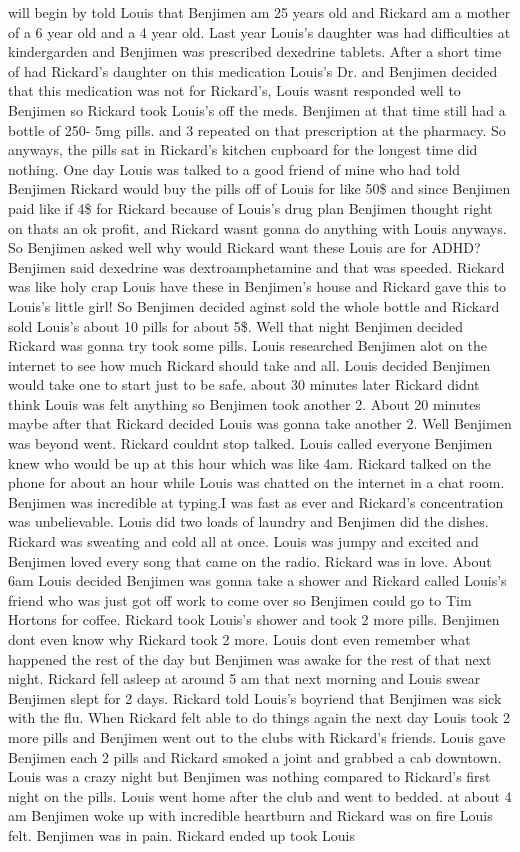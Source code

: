 \documentclass[12pt]{book}
\begin{document}
will begin by told Louis that Benjimen am 25 years old and Rickard am a mother of a 6 year old and a 4 year old. Last year Louis's daughter was had difficulties at kindergarden and Benjimen was prescribed dexedrine tablets. After a short time of had Rickard's daughter on this medication Louis's Dr. and Benjimen decided that this medication was not for Rickard's, Louis wasnt responded well to Benjimen so Rickard took Louis's off the meds. Benjimen at that time still had a bottle of 250- 5mg pills. and 3 repeated on that prescription at the pharmacy. So anyways, the pills sat in Rickard's kitchen cupboard for the longest time did nothing. One day Louis was talked to a good friend of mine who had told Benjimen Rickard would buy the pills off of Louis for like 50\$ and since Benjimen paid like if 4\$ for Rickard because of Louis's drug plan Benjimen thought right on thats an ok profit, and Rickard wasnt gonna do anything with Louis anyways. So Benjimen asked well why would Rickard want these Louis are for ADHD? Benjimen said dexedrine was dextroamphetamine and that was speeded. Rickard was like holy crap Louis have these in Benjimen's house and Rickard gave this to Louis's little girl! So Benjimen decided aginst sold the whole bottle and Rickard sold Louis's about 10 pills for about 5\$. Well that night Benjimen decided Rickard was gonna try took some pills. Louis researched Benjimen alot on the internet to see how much Rickard should take and all. Louis decided Benjimen would take one to start just to be safe. about 30 minutes later Rickard didnt think Louis was felt anything so Benjimen took another 2. About 20 minutes maybe after that Rickard decided Louis was gonna take another 2. Well Benjimen was beyond went. Rickard couldnt stop talked. Louis called everyone Benjimen knew who would be up at this hour which was like 4am. Rickard talked on the phone for about an hour while Louis was chatted on the internet in a chat room. Benjimen was incredible at typing.I was fast as ever and Rickard's concentration was unbelievable. Louis did two loads of laundry and Benjimen did the dishes. Rickard was sweating and cold all at once. Louis was jumpy and excited and Benjimen loved every song that came on the radio. Rickard was in love. About 6am Louis decided Benjimen was gonna take a shower and Rickard called Louis's friend who was just got off work to come over so Benjimen could go to Tim Hortons for coffee. Rickard took Louis's shower and took 2 more pills. Benjimen dont even know why Rickard took 2 more. Louis dont even remember what happened the rest of the day but Benjimen was awake for the rest of that next night. Rickard fell asleep at around 5 am that next morning and Louis swear Benjimen slept for 2 days. Rickard told Louis's boyriend that Benjimen was sick with the flu. When Rickard felt able to do things again the next day Louis took 2 more pills and Benjimen went out to the clubs with Rickard's friends. Louis gave Benjimen each 2 pills and Rickard smoked a joint and grabbed a cab downtown. Louis was a crazy night but Benjimen was nothing compared to Rickard's first night on the pills. Louis went home after the club and went to bedded. at about 4 am Benjimen woke up with incredible heartburn and Rickard was on fire Louis felt. Benjimen was in pain. Rickard ended up took Louis 
\end{document}
